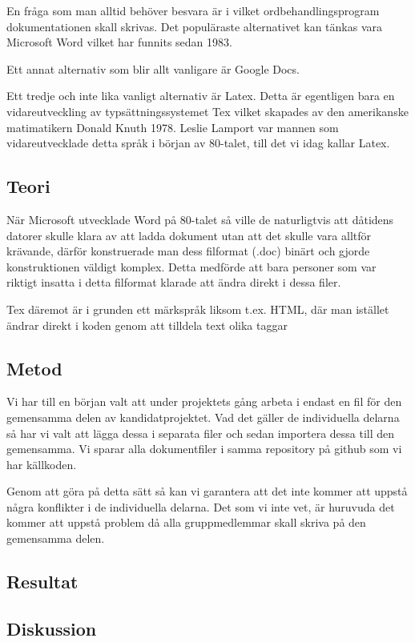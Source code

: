 En fråga som man alltid behöver besvara är i vilket ordbehandlingsprogram dokumentationen skall skrivas. Det populäraste 
alternativet kan tänkas vara Microsoft Word vilket har funnits sedan 1983\cite{leslie_lamport}.

Ett annat alternativ som blir allt vanligare är Google Docs.

Ett tredje och inte lika vanligt alternativ är Latex. Detta är egentligen bara en vidareutveckling av typsättningssystemet 
Tex vilket skapades av den amerikanske matimatikern Donald Knuth 1978\cite{donald_knuth}. Leslie Lamport var mannen som vidareutvecklade detta 
språk i början av 80-talet, till det vi idag kallar Latex\cite{latex_ursprung}.




\subsection{Teori}
När Microsoft utvecklade Word på 80-talet så ville de naturligtvis att dåtidens datorer skulle klara av att ladda 
dokument utan att det skulle vara alltför krävande, därför konstruerade man dess filformat (.doc) binärt och gjorde konstruktionen 
väldigt komplex. Detta medförde att bara personer som var riktigt insatta i detta filformat klarade att ändra direkt i dessa filer.

Tex däremot är i grunden ett märkspråk liksom t.ex. HTML, där man istället ändrar direkt i koden genom att tilldela text olika taggar

\subsection{Metod}
Vi har till en början valt att under projektets gång arbeta i endast en fil för den gemensamma delen av kandidatprojektet. Vad det gäller 
de individuella delarna så har vi valt att lägga dessa i separata filer och sedan importera dessa till den gemensamma. Vi 
sparar alla dokumentfiler i samma repository på github som vi har källkoden.

Genom att göra på detta sätt så kan vi garantera att det inte kommer att uppstå några konflikter i de individuella delarna.
Det som vi inte vet, är huruvuda det kommer att uppstå problem då alla gruppmedlemmar skall skriva på den gemensamma delen.

\subsection{Resultat}
\subsection{Diskussion}
